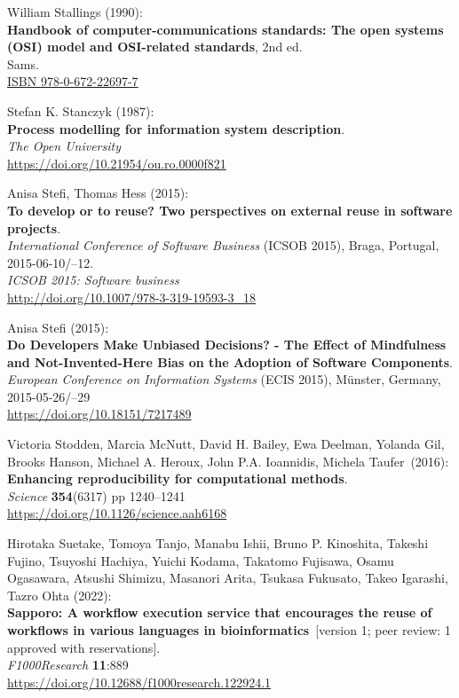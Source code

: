 \begin{thebibliography}{9}
 William Stallings (1990): \\
\textbf{Handbook of computer-communications standards: {The} open systems ({OSI}) model and {OSI-related} standards}, 2nd ed. \\
Sams.\\
\href{https://identifiers.org/isbn/9780672226977}{ISBN 978-0-672-22697-7}
 
Stefan K. Stanczyk (1987): \\
\textbf{Process modelling for information system description}.\\
\emph{The Open University} \\
\url{https://doi.org/10.21954/ou.ro.0000f821}

Anisa Stefi, Thomas Hess (2015): \\
\textbf{To develop or to reuse? Two perspectives on external reuse in software projects}. \\
\emph{International Conference of Software Business} (ICSOB 2015), Braga, Portugal, 2015-06-10/--12.\\
\emph{ICSOB 2015: Software business} \\
\url{http://doi.org/10.1007/978-3-319-19593-3_18}

Anisa Stefi (2015): \\
\textbf{Do Developers Make Unbiased Decisions? - The Effect of Mindfulness and Not-Invented-Here Bias on the Adoption of Software Components}. \\
\emph{European Conference on Information Systems} (ECIS 2015), Münster, Germany, 2015-05-26/--29 \\
\url{https://doi.org/10.18151/7217489}

Victoria Stodden, Marcia McNutt, David H. Bailey, Ewa Deelman,
Yolanda Gil, Brooks Hanson, Michael A. Heroux, John P.A. Ioannidis,
Michela Taufer~(2016):\\
\textbf{Enhancing reproducibility for computational methods}.\\
\emph{Science} \textbf{354}(6317) pp 1240--1241\\
\url{https://doi.org/10.1126/science.aah6168}

Hirotaka Suetake, Tomoya Tanjo, Manabu Ishii, Bruno
P. Kinoshita, Takeshi Fujino, Tsuyoshi Hachiya, Yuichi Kodama, Takatomo
Fujisawa, Osamu Ogasawara, Atsushi Shimizu, Masanori Arita, Tsukasa
Fukusato, Takeo Igarashi, Tazro Ohta (2022):\\
\textbf{Sapporo: A workflow execution service that encourages the reuse
of workflows in various languages in bioinformatics}~[version 1; peer review: 1 approved with reservations].\\
\emph{F1000Research} \textbf{11}:889\\
\url{https://doi.org/10.12688/f1000research.122924.1}


\end{thebibliography}
